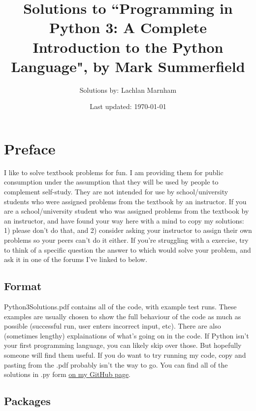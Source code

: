 \documentclass{report}
\begin{document}
\makeatletter
\lst@CCPutMacro
    \@empty\z@\@empty
\makeatother
\title{Solutions to ``Programming in Python 3: A Complete Introduction to the Python Language", by Mark Summerfield}
\author{Solutions by: Lachlan Marnham}
\date{Last updated: \today}
\maketitle
\tableofcontents
\chapter*{Preface}
I like to solve textbook problems for fun. I am providing them for public consumption under the assumption that they will be 
used by people to complement self-study. They are not intended for use by school/university students who were assigned 
problems from the textbook by an instructor. If you are a school/university student who was assigned problems from the 
textbook by an instructor, and have found your way here with a mind to copy my solutions: 1) please don't do that, and 
2) consider asking your instructor to assign their own problems so your peers can't do it either. If you're struggling with a 
exercise, try to think of a specific question the answer to which would solve your problem, and ask it in one of the forums 
I've linked to below.

\section*{Format}

Python3Solutions.pdf contains all of the code, with example test runs. These examples are usually chosen to show the full 
behaviour of the code as much as possible (successful run, user enters incorrect input, etc). There are also (sometimes 
lengthy) explainations of what's going on in the code. If Python isn't your first programming language, you can likely skip 
over those. But hopefully someone will find them useful. If you do want to try running my code, copy and pasting from the 
.pdf probably isn't the way to go. You can find all of the solutions in .py form 
\href{https://github.com/LachlanMarnham/SolutionsToProgrammingInPython3}{on my GitHub page}.

\section*{Packages}
\end{document}
